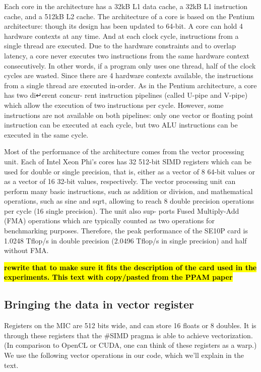 \documentclass[10pt,conference,compsocconf]{IEEEtran}
\newcommand{\todo}[1]{{\color{red}\textbf{\hl{#1}}\xspace}}
\begin{document}
Each core in the architecture has a 32kB L1 data cache, a 32kB L1
instruction cache, and a 512kB L2 cache. The architecture of a core is
based on the Pentium architecture: though its design has been updated
to 64-bit. A core can hold 4 hardware contexts at any time. And at
each clock cycle, instructions from a single thread are executed. Due
to the hardware constraints and to overlap latency, a core never
executes two instructions from the same hardware context
consecutively. In other words, if a program only uses one thread, half
of the clock cycles are wasted. Since there are 4 hardware contexts
available, the instructions from a single thread are executed
in-order. As in the Pentium architecture, a core has two di↵erent
concur- rent instruction pipelines (called U-pipe and V-pipe) which
allow the execution of two instructions per cycle. However, some
instructions are not available on both pipelines: only one vector or
floating point instruction can be executed at each cycle, but two ALU
instructions can be executed in the same cycle.

Most of the performance of the architecture comes from the vector
processing unit. Each of Intel Xeon Phi’s cores has 32 512-bit SIMD
registers which can be used for double or single precision, that is,
either as a vector of 8 64-bit values or as a vector of 16 32-bit
values, respectively. The vector processing unit can perform many
basic instructions, such as addition or division, and mathematical
operations, such as sine and sqrt, allowing to reach 8 double
precision operations per cycle (16 single precision). The unit also
sup- ports Fused Multiply-Add (FMA) operations which are typically
counted as two operations for benchmarking purposes. Therefore, the
peak performance of the SE10P card is 1.0248 Tflop/s in double
precision (2.0496 Tflop/s in single precision) and half without FMA.

\todo{rewrite that to make sure it fits the description of the card
  used in the experiments. This text with copy/pasted from the PPAM
  paper}

\subsection{Bringing the data in vector register}


Registers on the MIC are 512 bits wide, and can store 16 floats or 8
doubles. It is through these registers that the \#SIMD pragma is able
to achieve vectorization. (In comparison to OpenCL or CUDA, one can
think of these registers as a warp.)  We use the following vector
operations in our code, which we'll explain in the text.
\end{document}
